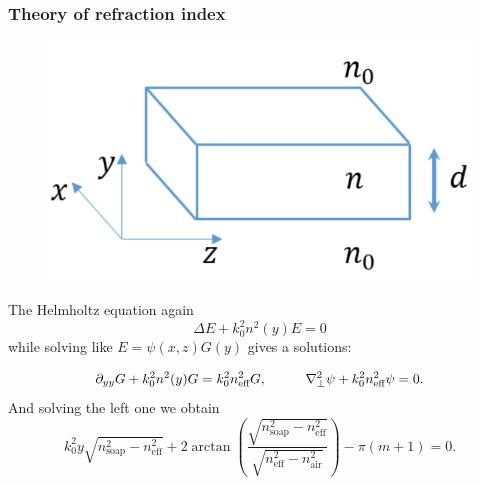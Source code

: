\frametitle{Theory of refraction index}
\begin{minipage}{0.35\textwidth}
    \begin{figure}[h]
    \centering
    \includegraphics[width=1\textwidth]{images/nature_scheme.png}
\end{figure}
\end{minipage}
\hfill
\begin{minipage}{0.55\textwidth}
	The Helmholtz equation again
	\begin{equation*}
		\Delta E + k_0^2 n^2(y) E = 0
	\end{equation*}    
	while solving like $E = \psi(x,z) G(y)$ gives a solutions:
\end{minipage}
	\begin{equation*}
		\partial_{y y}G + k_0^2 n^2(y) G = k_0^2 n^2_{\text{eff}} G,
	\hspace{1 cm}
		\nabla_{\perp}^2 \psi + k_0^2 n_\text{eff}^2 \psi = 0.
	\end{equation*}
	And solving the left one we obtain
	\begin{equation*}
		k_0^2 y \sqrt{n_\text{soap}^2 - n_\text{eff}^2} + 2 \arctan\left(\frac{\sqrt{n_\text{soap}^2 - n_\text{eff}^2}}{\sqrt{n_\text{eff}^2 - n_\text{air}^2}}\right) - \pi(m+1) = 0.
	\end{equation*}
